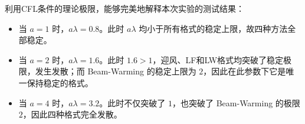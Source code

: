 \documentclass[a4paper,11pt]{ctexart}
\begin{document}
利用CFL条件的理论极限，能够完美地解释本次实验的测试结果：
\begin{itemize}
    \item 当 $a=1$ 时，$a\lambda = 0.8$。此时 $a\lambda$ 均小于所有格式的稳定上限，故四种方法全部稳定。
    \item 当 $a=2$ 时，$a\lambda = 1.6$。此时 $1.6 > 1$，迎风、LF和LW格式均突破了稳定极限，发生发散；而 Beam-Warming 的稳定上限为 $2$，因此在此参数下它是唯一保持稳定的格式。
    \item 当 $a=4$ 时，$a\lambda = 3.2$。此时不仅突破了 $1$，也突破了 Beam-Warming 的极限 $2$，因此四种格式完全发散。
\end{itemize}
\end{document}
